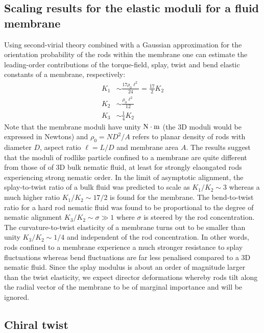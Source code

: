 \subsection{Scaling results for the elastic moduli for a fluid membrane}

Using second-virial theory combined with a Gaussian approximation for the orientation probability of the rods within the membrane one can estimate the leading-order contributions of the torque-field, splay, twist and bend elastic constants of a membrane, respectively:
\begin{align}
  K_{1}   & \sim  \frac{17 \rho_{0} \ell^{2}}{24} = \frac{17}{2} K_{2}   \nonumber \\ 
 K_{2}  & \sim  \frac{\rho_{0} \ell^{2}}{12}   \nonumber \\ 
 K_{3} &\sim  \frac{1}{4} K_{2}
  \label{kexp}
\end{align}
Note that the membrane moduli have unity ${\rm N \cdot m}$ (the 3D moduli would be expressed in Newtons) and $\rho_{0} = ND^{2}/A$ refers to planar density of rods with diameter $D$, aspect ratio $\ell = L/D$ and membrane area $A$. The results suggest that the moduli of rodlike particle confined to a membrane are quite different from those of of 3D bulk nematic fluid, at least for strongly elaongated rods experiencing strong nematic order.  In the limit of asymptotic alignment, the splay-to-twist ratio of a bulk fluid  \cite{odijkelastic}  was predicted to scale as $K_{1}/K_{2} \sim 3 $ whereas a much higher ratio $K_{1}/K_{2} \sim 17/2$ is found for the membrane. The bend-to-twist ratio for a hard rod nematic fluid was found to be proportional to the degree of nematic alignment $K_{3}/K_{2} \sim \sigma \gg 1$ \cite{odijkelastic} where $\sigma$ is steered by the rod concentration.  The curvature-to-twist elasticity of a membrane turns out to be smaller than unity $K_{3}/K_{2} \sim 1/4$ and independent of the rod concentration.  In other words, rods confined to a membrane experience a much stronger resistance to splay fluctuations whereas  bend fluctuations are far less penalised compared to a 3D nematic fluid.  Since the splay modulus is about an order of magnitude larger than the twist elasticity, we expect director deformations whereby rods tilt along the radial vector of the membrane to be of marginal importance and  will be ignored.  





\subsection{Chiral twist }

